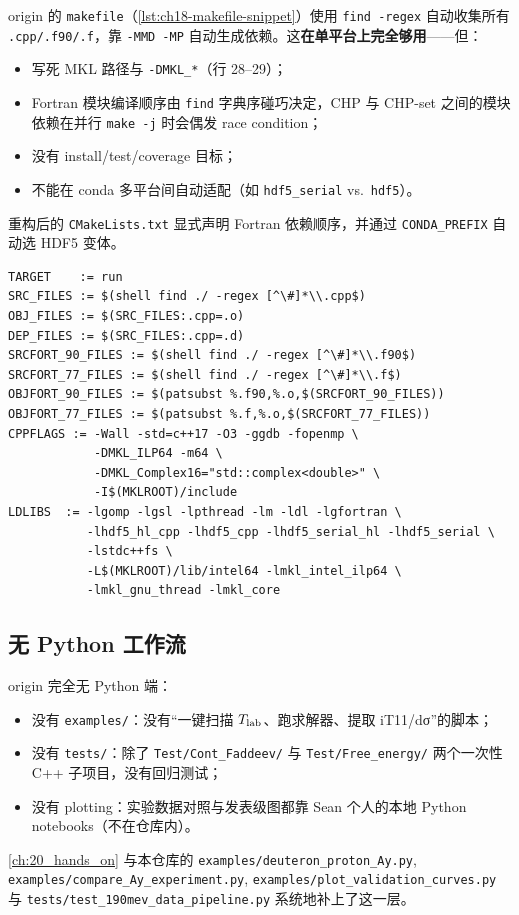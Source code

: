 origin 的 \texttt{makefile}（\cref{lst:ch18-makefile-snippet}）使用
\texttt{find -regex} 自动收集所有 \texttt{.cpp/.f90/.f}，靠
\texttt{-MMD -MP} 自动生成依赖。这\textbf{在单平台上完全够用}——但：
\begin{itemize}
\item 写死 MKL 路径与 \texttt{-DMKL\_*}（行 28--29）；
\item Fortran 模块编译顺序由 \texttt{find} 字典序碰巧决定，CHP 与 CHP-set
      之间的模块依赖在并行 \texttt{make -j} 时会偶发 race condition；
\item 没有 install/test/coverage 目标；
\item 不能在 conda 多平台间自动适配（如 \texttt{hdf5\_serial} vs.\
      \texttt{hdf5}）。
\end{itemize}
重构后的 \texttt{CMakeLists.txt} 显式声明 Fortran 依赖顺序，并通过
\texttt{CONDA\_PREFIX} 自动选 HDF5 变体。

\begin{lstlisting}[style=config, caption={\texttt{CPP/makefile} 关键片段
（origin 行 8--36）。},
                   label={lst:ch18-makefile-snippet}]
TARGET    := run
SRC_FILES := $(shell find ./ -regex [^\#]*\\.cpp$)
OBJ_FILES := $(SRC_FILES:.cpp=.o)
DEP_FILES := $(SRC_FILES:.cpp=.d)
SRCFORT_90_FILES := $(shell find ./ -regex [^\#]*\\.f90$)
SRCFORT_77_FILES := $(shell find ./ -regex [^\#]*\\.f$)
OBJFORT_90_FILES := $(patsubst %.f90,%.o,$(SRCFORT_90_FILES))
OBJFORT_77_FILES := $(patsubst %.f,%.o,$(SRCFORT_77_FILES))
CPPFLAGS := -Wall -std=c++17 -O3 -ggdb -fopenmp \
            -DMKL_ILP64 -m64 \
            -DMKL_Complex16="std::complex<double>" \
            -I$(MKLROOT)/include
LDLIBS  := -lgomp -lgsl -lpthread -lm -ldl -lgfortran \
           -lhdf5_hl_cpp -lhdf5_cpp -lhdf5_serial_hl -lhdf5_serial \
           -lstdc++fs \
           -L$(MKLROOT)/lib/intel64 -lmkl_intel_ilp64 \
           -lmkl_gnu_thread -lmkl_core
\end{lstlisting}

\subsection{无 Python 工作流}

origin 完全无 Python 端：
\begin{itemize}
\item 没有 \texttt{examples/}：没有“一键扫描 ${T_{\text{lab}}}$、跑求解器、提取
      iT11/dσ”的脚本；
\item 没有 \texttt{tests/}：除了 \texttt{Test/Cont\_Faddeev/} 与
      \texttt{Test/Free\_energy/} 两个一次性 C++ 子项目，没有回归测试；
\item 没有 plotting：实验数据对照与发表级图都靠 Sean 个人的本地 Python
      notebooks（不在仓库内）。
\end{itemize}
\cref{ch:20_hands_on} 与本仓库的
\texttt{examples/deuteron\_proton\_Ay.py},
\texttt{examples/compare\_Ay\_experiment.py},
\texttt{examples/plot\_validation\_curves.py} 与
\texttt{tests/test\_190mev\_data\_pipeline.py} 系统地补上了这一层。


